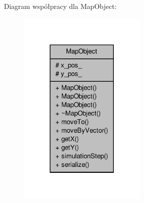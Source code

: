 Diagram współpracy dla Map\-Object\-:
\nopagebreak
\begin{figure}[H]
\begin{center}
\leavevmode
\includegraphics[width=176pt]{classMapObject__coll__graph}
\end{center}
\end{figure}
